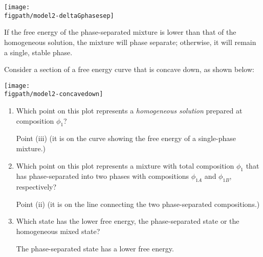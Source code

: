 \begin{activity}
\begin{model}
		\vspace{0.1in}
		\centerline{\texttt{[image: \\figpath/model2-deltaGphasesep]}}
	
	If the free energy of the phase-separated mixture is lower than that of the homogeneous solution, the mixture will phase separate; otherwise, it will remain a single, stable phase.

\end{model}

		\vspace{0.1in}
\begin{ctqs}
		\question Consider a section of a free energy curve that is concave down, as shown below:
	
		\vspace{0.1in}
		\centerline{\texttt{[image: \\figpath/model2-concavedown]}}

			\begin{enumerate}
				\item Which point on this plot represents a \emph{homogeneous solution} prepared at composition $\phi_1$?
					
					\begin{solution}[0.75in]
					
						Point (iii) (it is on the curve showing the free energy of a single-phase mixture.)
					
					\end{solution}
					
				\item Which point on this plot represents a mixture with total composition $\phi_1$ that has phase-separated into two phases with compositions $\phi_{1A}$ and $\phi_{1B}$, respectively?
					
					\begin{solution}[0.75in]
					
						Point (ii) (it is on the line connecting the two phase-separated compositions.)
						
					\end{solution}
					
				\item Which state has the lower free energy, the phase-separated state or the homogeneous mixed state?
					
					\begin{solution}[0.75in]
					
						The phase-separated state has a lower free energy.
					
					\end{solution}
					

\end{enumerate}
\end{ctqs}
\end{activity}

